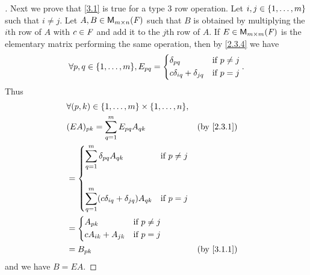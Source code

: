 \begin{proof}[]
  Next we prove that \cref{3.1} is true for a type 3 row operation.
  Let \(i, j \in \left\lbrace1, \dots, m\right\rbrace\) such that \(i \neq j\).
  Let \(A, B \in \mathsf{M}_{{m} \times n}({\mathit{F}})\) such that \(B\) is obtained by multiplying the \(i\)th row of \(A\) with \(c \in \mathit{F}\) and add it to the \(j\)th row of \(A\).
  If \(E \in \mathsf{M}_{{m} \times m}({\mathit{F}})\) is the elementary matrix performing the same operation, then by \cref{2.3.4} we have
  \[
    \forall p, q \in \set{1, \dots, m}, E_{p q} = \begin{dcases}
      \delta_{p q}                  & \text{if } p \neq j \\
      c \delta_{i q} + \delta_{j q} & \text{if } p = j
    \end{dcases}.
  \]
  Thus
  \begin{align*}
     & \forall (p, k) \in \set{1, \dots, m} \times \set{1, \dots, n},                                                                      \\
     & (EA)_{p k} = \sum_{q = 1}^m E_{p q} A_{q k}                                                           &  & \text{(by \cref{2.3.1})} \\
     & = \begin{dcases}
           \sum_{q = 1}^m \delta_{p q} A_{q k}                    & \text{if } p \neq j \\                    \\
           \sum_{q = 1}^m (c \delta_{i q} + \delta_{j q}) A_{q k} & \text{if } p = j
         \end{dcases}                                \\
     & = \begin{dcases}
           A_{p k}             & \text{if } p \neq j \\
           c A_{i k} + A_{j k} & \text{if } p = j
         \end{dcases}                                                                                         \\
     & = B_{p k}                                                                                             &  & \text{(by \cref{3.1.1})}
  \end{align*}
  and we have \(B = EA\).


\end{proof}
